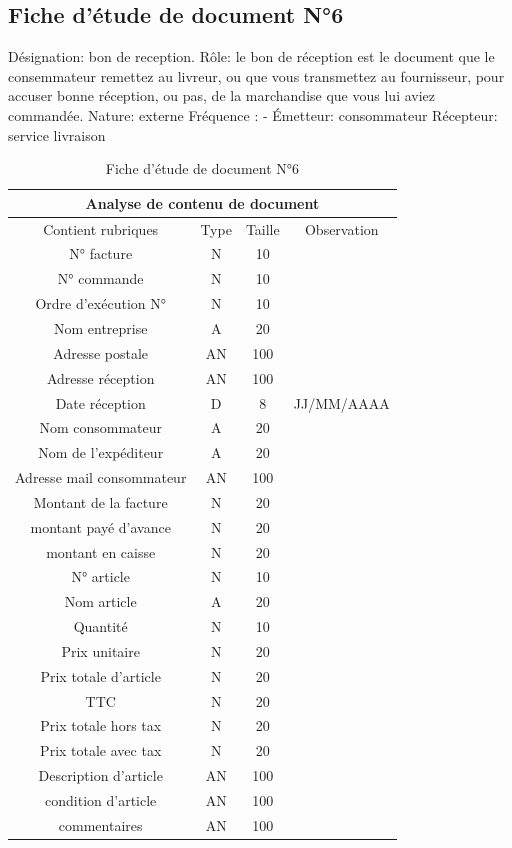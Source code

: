 \documentclass[edit,12pt,a4paper,ChapStyle,oneside,doubleinterligne]{report}
\begin{document}
\newpage
\subsection{Fiche d’étude de document N°6}
\noindent Désignation: bon de reception.
\newline Rôle: le bon de réception est le document que le consemmateur remettez au livreur, ou que vous transmettez au fournisseur, pour accuser bonne réception, ou pas, de la marchandise que vous lui aviez commandée.
\newline Nature: externe
\newline Fréquence : -
\newline Émetteur: consommateur
\newline Récepteur: service livraison \cite{bonr}
\begin{table}[h!]
    \centering
    \begin{tabular}{|c|c|c|c|}
         \hline
\multicolumn{4}{|c|}{Analyse de contenu de document}\\
\hline
Contient rubriques & Type & Taille & Observation\\
\hline
 N° facture  & N & 10 & \\
 N° commande  & N & 10 & \\
 Ordre d’exécution N° & N & 10 & \\
 Nom entreprise & A & 20 & \\
 Adresse postale & AN & 100 & \\
 Adresse réception & AN & 100 & \\
Date réception & D & 8 & JJ/MM/AAAA \\
Nom consommateur & A & 20 & \\
Nom de l'expéditeur & A & 20 & \\
Adresse mail consommateur & AN & 100 & \\
Montant de la facture & N & 20 & \\
montant payé d'avance & N & 20 & \\
montant en caisse & N & 20 & \\
N° article & N & 10 & \\
Nom article & A & 20 & \\
Quantité & N & 10 & \\
Prix unitaire & N & 20 & \\
Prix totale d’article & N & 20 & \\
TTC & N & 20 & \\
Prix totale hors tax & N & 20 & \\
Prix totale avec tax & N & 20 & \\
Description d’article & AN & 100 & \\
condition d’article & AN & 100 & \\
commentaires & AN & 100 & \\
\hline
    \end{tabular}
    \caption{Fiche d’étude de document N°6}
    \label{tab:6}
\end{table}
\newpage
\end{document}

